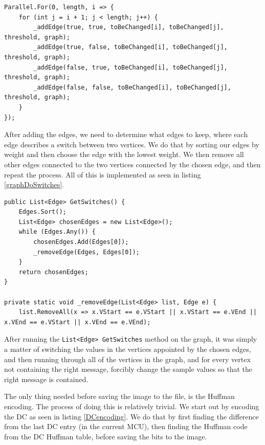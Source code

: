 \begin{lstlisting}[firstnumber=655,label=implementationPairs,caption={Checks all edges between distincive pairs of vertices \textbf{File: }JPEGImage.cs}]
Parallel.For(0, length, i => {
    for (int j = i + 1; j < length; j++) {
        _addEdge(true, true, toBeChanged[i], toBeChanged[j], threshold, graph);
        _addEdge(true, false, toBeChanged[i], toBeChanged[j], threshold, graph);
        _addEdge(false, true, toBeChanged[i], toBeChanged[j], threshold, graph);
        _addEdge(false, false, toBeChanged[i], toBeChanged[j], threshold, graph);
    }
});
\end{lstlisting}

After adding the edges, we need to determine what edges to keep, where each edge describes a switch between two vertices.
We do that by sorting our edges by weight and then choose the edge with the lowest weight. We then remove all other edges connected to the two vertices connected by the chosen edge, and then repeat the process.
All of this is implemented as seen in listing \ref{graphDoSwitches}.

\begin{lstlisting}[firstnumber=14,label=graphDoSwitches, caption={Implementation of greedy algorithm for choosing switches \textbf{File: }JPEGImage.cs}]
public List<Edge> GetSwitches() {
    Edges.Sort();
    List<Edge> chosenEdges = new List<Edge>();
    while (Edges.Any()) {
        chosenEdges.Add(Edges[0]);
        _removeEdge(Edges, Edges[0]);
    }
    return chosenEdges;
}

private static void _removeEdge(List<Edge> list, Edge e) {
    list.RemoveAll(x => x.VStart == e.VStart || x.VStart == e.VEnd || x.VEnd == e.VStart || x.VEnd == e.VEnd);

\end{lstlisting}

After running the \lstinline|List<Edge> GetSwitches| method on the graph, it was simply a matter of switching the values in the vertices appointed by the chosen edges, and then running through all of the vertices in the graph, and for every vertex not containing the right message, forcibly change the sample values so that the right message is contained.


The only thing needed before saving the image to the file, is the Huffman encoding.
The process of doing this is relatively trivial.
We start out by encoding the DC as seen in listing \ref{DCencoding}. We do that by first finding the difference from the last DC entry (in the current MCU), then finding the Huffman code from the DC Huffman table, before saving the bits to the image.

